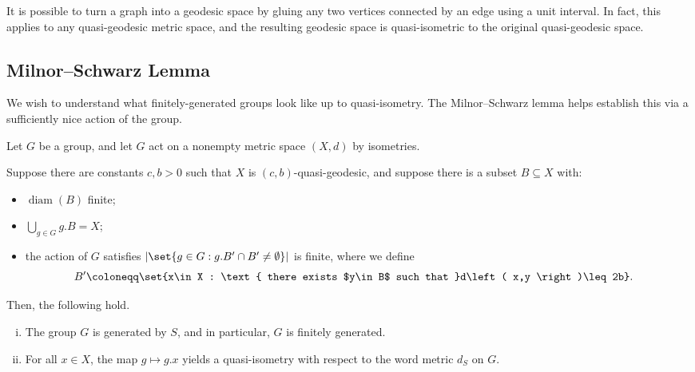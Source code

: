 \documentclass[10pt]{mypackage}
\renewcommand{\coloneq}{\coloneqq}
\begin{document}
It is possible to turn a graph into a geodesic space by gluing any two vertices connected by an edge using a unit interval. In fact, this applies to any quasi-geodesic metric space, and the resulting geodesic space is quasi-isometric to the original quasi-geodesic space.
\subsection{Milnor--Schwarz Lemma}%
We wish to understand what finitely-generated groups look like up to quasi-isometry. The Milnor--Schwarz lemma helps establish this via a sufficiently nice action of the group.
\begin{proposition}
  Let $G$ be a group, and let $G$ act on a nonempty metric space $\left( X,d \right)$ by isometries.

  Suppose there are constants $c,b > 0$ such that $X$ is $\left( c,b \right)$-quasi-geodesic, and suppose there is a subset $B\subseteq X$ with:
  \begin{itemize}
    \item $\operatorname{diam}\left( B \right)$ finite;
    \item $\bigcup_{g\in G}g.B = X$;
    \item the action of $G$ satisfies $ \left\vert \set{g\in G : g.B'\cap B' \neq \emptyset} \right\vert $ is finite, where we define
      \begin{align*}
        B' &\coloneq \set{x\in X : \text{ there exists $y\in B$ such that }d\left( x,y \right)\leq 2b}.
      \end{align*}
  \end{itemize}
  Then, the following hold.
  \begin{enumerate}[(i)]
    \item The group $G$ is generated by $S$, and in particular, $G$ is finitely generated.
    \item For all $x\in X$, the map $g\mapsto g.x$ yields a quasi-isometry with respect to the word metric $d_S$ on $G$.
  \end{enumerate}
\end{proposition}
\end{document}
